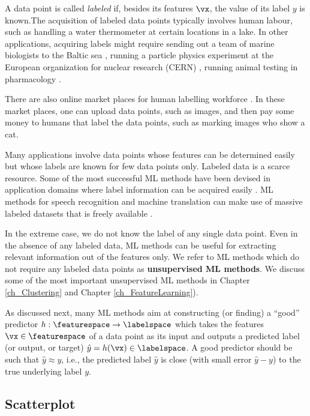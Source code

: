 \documentclass[12pt]{report}
\begin{document}
A data point is called \emph{labeled} if, besides its features $\vx$, 
the value of its label $y$ is known.The acquisition of labeled data 
points typically involves human labour, such as handling a water 
thermometer at certain locations in a lake. In other applications, 
acquiring labels might require sending out a team of marine biologists 
to the Baltic sea \cite{MLMarineBiology}, running a particle physics 
experiment at the European organization for nuclear research (CERN) \cite{MLCERN}, 
running animal testing in pharmacology \cite{MLPharma}. 

There are also online market places for human labelling 
workforce \cite{Mort2018}. In these market places, one 
can upload data points, such as images, and then pay 
some money to humans that label the data points, such 
as marking images who show a cat. 

Many applications involve data points whose features can be 
determined easily but whose labels are known for few data points 
only. Labeled data is a scarce resource. Some of the most successful 
ML methods have been devised in application domains where 
label information can be acquired easily \cite{UnreasonableData}. 
ML methods for  speech recognition and machine translation can 
make use of massive labeled datasets that is freely available \cite{Koehn2005}. 

In the extreme case, we do not know the label of any single 
data point. Even in the absence of any labeled data, ML methods 
can be useful for extracting relevant information out of the 
features only. We refer to ML methods which do not require 
any labeled data points as {\bf unsupervised ML methods}. 
We discuss some of the most important unsupervised ML 
methods in Chapter \ref{ch_Clustering} and Chapter \ref{ch_FeatureLearning}).  

As discussed next, many ML methods aim at constructing 
(or finding) a ``good'' predictor $h: \featurespace \rightarrow \labelspace$ 
which takes the features $\vx \in \featurespace$ of a data point 
as its input and outputs a predicted label (or output, or target) 
$\hat{y} = h(\vx) \in \labelspace$. A good predictor should be 
such that $\hat{y} \approx y$, i.e., the predicted label $\hat{y}$ 
is close (with small error $\hat{y} - y$) to the true underlying label $y$. 

\subsection{Scatterplot} 
\label{equ_subsection_scatterplot}
\end{document}
